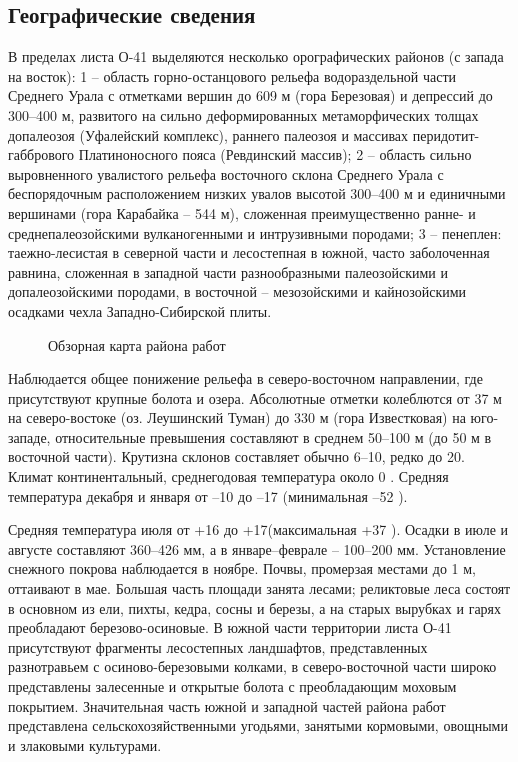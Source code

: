 \subsection*{Географические сведения}
В пределах листа О-41 выделяются несколько орографических районов (с запада на восток): 1 – область горно-останцового рельефа водораздельной части Среднего Урала с отметками вершин до 609 м (гора Березовая) и депрессий до 300–400 м, развитого на сильно деформированных метаморфических толщах допалеозоя (Уфалейский комплекс), раннего палеозоя и массивах перидотит-габбрового Платиноносного пояса (Ревдинский массив); 2 – область сильно выровненного увалистого рельефа восточного склона Среднего Урала с беспорядочным расположением низких
увалов высотой 300–400 м и единичными вершинами (гора Карабайка – 544 м), сложенная преимущественно ранне- и среднепалеозойскими вулканогенными и интрузивными породами; 3 – пенеплен: таежно-лесистая в северной части и лесостепная в южной, часто заболоченная равнина, сложенная в западной части разнообразными палеозойскими и допалеозойскими породами, в восточной – мезозойскими и кайнозойскими осадками чехла Западно-Сибирской плиты. 
\begin{figure}[h]
	\caption{Обзорная карта района работ}
\end{figure}
Наблюдается общее понижение рельефа в северо-восточном направлении, где присутствуют крупные болота и озера. Абсолютные отметки колеблются от 37 м на северо-востоке (оз. Леушинский Туман) до 330 м (гора Известковая) на юго-западе, относительные превышения составляют в среднем 50–100 м (до 50 м в восточной части). Крутизна склонов составляет обычно 6–10\degree, редко до 20\degree.
Климат континентальный, среднегодовая температура около 0 . Средняя температура декабря и января от –10 до –17  (минимальная –52 ).

Средняя температура июля от +16 до +17\degree (максимальная +37 ). Осадки в июле и августе составляют 360–426 мм, а в январе–феврале – 100–200 мм.
Установление снежного покрова наблюдается в ноябре. Почвы, промерзая местами до 1 м, оттаивают в мае. Большая часть площади занята лесами; реликтовые леса состоят в основном из ели, пихты, кедра, сосны и березы, а на старых вырубках и гарях преобладают березово-осиновые. В южной части территории листа О-41 присутствуют фрагменты лесостепных ландшафтов, представленных разнотравьем с осиново-березовыми колками, в северо-восточной части широко представлены залесенные и открытые болота с преобладающим моховым покрытием. Значительная часть южной и западной частей района работ представлена сельскохозяйственными угодьями, занятыми кормовыми, овощными и злаковыми культурами. 

